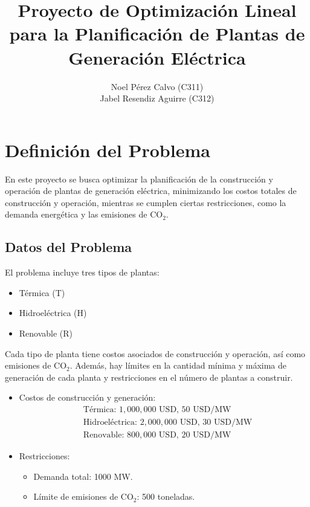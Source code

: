 \documentclass{article}
\title{Proyecto de Optimización Lineal para la Planificación de Plantas de Generación Eléctrica}
\author{Noel Pérez Calvo (C311)\\ Jabel Resendiz Aguirre (C312)}
\date{}
\begin{document}
\maketitle

\section*{Definición del Problema}
En este proyecto se busca optimizar la planificación de la construcción y operación de plantas de generación eléctrica, minimizando los costos totales de construcción y operación, mientras se cumplen ciertas restricciones, como la demanda energética y las emisiones de CO$_2$.

\subsection*{Datos del Problema}
El problema incluye tres tipos de plantas:
\begin{itemize}[noitemsep]
    \item Térmica (T)
    \item Hidroeléctrica (H)
    \item Renovable (R)
\end{itemize}
Cada tipo de planta tiene costos asociados de construcción y operación, así como emisiones de CO$_2$. Además, hay límites en la cantidad mínima y máxima de generación de cada planta y restricciones en el número de plantas a construir.

\begin{itemize}[noitemsep]
    \item Costos de construcción y generación:
    \begin{align*}
        &\text{Térmica: } 1,000,000 \text{ USD, 50 USD/MW} \\
        &\text{Hidroeléctrica: } 2,000,000 \text{ USD, 30 USD/MW} \\
        &\text{Renovable: } 800,000 \text{ USD, 20 USD/MW}
    \end{align*}
    \item Restricciones:
    \begin{itemize}[noitemsep]
        \item Demanda total: 1000 MW.
        \item Límite de emisiones de CO$_2$: 500 toneladas.
    \end{itemize}
\end{itemize}
\end{document}
